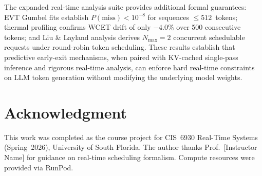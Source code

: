 \documentclass[conference]{IEEEtran}
\begin{document}
The expanded real-time analysis suite provides additional formal guarantees: EVT Gumbel fits establish $P(\text{miss}) < 10^{-8}$ for sequences $\leq512$~tokens; thermal profiling confirms WCET drift of only $-4.0\%$ over 500 consecutive tokens; and Liu \& Layland analysis derives $N_{\max}=2$ concurrent schedulable requests under round-robin token scheduling. These results establish that predictive early-exit mechanisms, when paired with KV-cached single-pass inference and rigorous real-time analysis, can enforce hard real-time constraints on LLM token generation without modifying the underlying model weights.

\section*{Acknowledgment}

This work was completed as the course project for CIS~6930 Real-Time Systems (Spring~2026), University of South Florida. The author thanks Prof.\ [Instructor Name] for guidance on real-time scheduling formalism. Compute resources were provided via RunPod.



\end{document}
